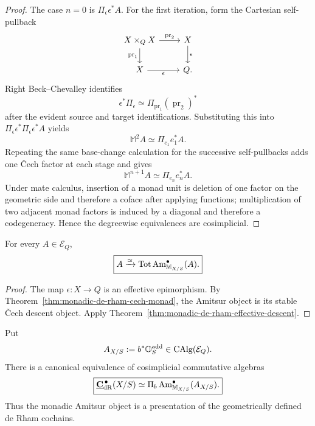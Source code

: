 \begin{proof}
The case \(n=0\) is \(\Pi_\epsilon\epsilon^*A\).  For the first iteration, form the Cartesian
self-pullback
\[
\begin{tikzcd}
    X\times_QX \ar[r,"\operatorname{pr}_2"] \ar[d,"\operatorname{pr}_1"'] & X \ar[d,"\epsilon"]\\
    X \ar[r,"\epsilon"'] & Q.
\end{tikzcd}
\]
Right Beck--Chevalley identifies
\[
    \epsilon^*\Pi_\epsilon
    \simeq
    \Pi_{\operatorname{pr}_1}(\operatorname{pr}_2)^*
\]
after the evident source and target identifications.  Substituting this into
\(\Pi_\epsilon\epsilon^*\Pi_\epsilon\epsilon^*A\) yields
\[
    \mathbb M^2A
    \simeq
    \Pi_{e_1}e_1^*A.
\]
Repeating the same base-change calculation for the successive self-pullbacks adds one \v{C}ech
factor at each stage and gives
\[
    \mathbb M^{n+1}A\simeq\Pi_{e_n}e_n^*A.
\]
Under mate calculus, insertion of a monad unit is deletion of one factor on the geometric side and
therefore a coface after applying functions; multiplication of two adjacent monad factors is induced
by a diagonal and therefore a codegeneracy.  Hence the degreewise equivalences are cosimplicial.
\end{proof}

\begin{corollary}
\label{cor:monadic-de-rham-descent}
For every \(A\in\mathcal E_Q\),
\[
\boxed{
    A\xrightarrow{\simeq}
    \operatorname*{Tot}\operatorname{Am}_{\mathbb M_{X/S}}^\bullet(A).
}
\]
\end{corollary}

\begin{proof}
The map \(\epsilon:X\to Q\) is an effective epimorphism.  By
Theorem~\ref{thm:monadic-de-rham-cech-monad}, the Amitsur object is its stable \v{C}ech descent
object.  Apply Theorem~\ref{thm:monadic-de-rham-effective-descent}.
\end{proof}

\begin{theorem}
\label{thm:cosimplicial-modal-de-rham-object}
Put
\[
    A_{X/S}:=b^*\mathbb O_S^{\mathrm{add}}\in\operatorname{CAlg}(\mathcal E_Q).
\]
There is a canonical equivalence of cosimplicial commutative algebras
\[
\boxed{
    \underline{\mathbf C}_{\mathrm{dR}}^{\,\bullet}(X/S)
    \simeq
    \Pi_b\operatorname{Am}_{\mathbb M_{X/S}}^\bullet(A_{X/S}).
}
\]
Thus the monadic Amitsur object is a presentation of the geometrically defined de Rham cochains.
\end{theorem}

